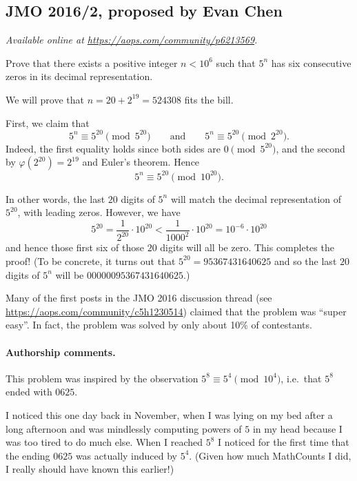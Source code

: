 \documentclass[11pt]{scrartcl}
\begin{document}
\subsection{JMO 2016/2, proposed by Evan Chen}
\textsl{Available online at \url{https://aops.com/community/p6213569}.}
\begin{mdframed}[style=mdpurplebox,frametitle={Problem statement}]
Prove that there exists a positive integer $n < 10^6$
such that $5^n$ has six consecutive zeros in its decimal representation.
\end{mdframed}
We will prove that $\boxed{n = 20 + 2^{19} = 524308}$ fits the bill.

First, we claim that
\[ 5^n \equiv 5^{20} \pmod{5^{20}} \qquad\text{and}\qquad
  5^n \equiv 5^{20} \pmod{2^{20}}. \]
Indeed, the first equality holds since both sides are $0 \pmod{5^{20}}$,
and the second by $\varphi(2^{20}) = 2^{19}$ and Euler's theorem.
Hence \[ 5^n \equiv 5^{20} \pmod{10^{20}}. \]

In other words, the last $20$ digits of $5^n$
will match the decimal representation of $5^{20}$, with leading zeros.
However, we have
\[ 5^{20} = \frac{1}{2^{20}} \cdot 10^{20}
  < \frac{1}{1000^2} \cdot 10^{20} = 10^{-6} \cdot 10^{20} \]
and hence those first six of those $20$ digits will all be zero.
This completes the proof!
(To be concrete, it turns out that $5^{20} = 95367431640625$
and so the last $20$ digits of $5^n$ will be $00000095367431640625$.)

\begin{remark*}
  Many of the first posts in the JMO 2016 discussion thread
  (see \url{https://aops.com/community/c5h1230514})
  claimed that the problem was ``super easy''.
  In fact, the problem was solved by only about 10\% of contestants.
\end{remark*}

\paragraph{Authorship comments.}
This problem was inspired by the observation $5^8 \equiv 5^4 \pmod{10^4}$,
i.e.\ that $5^8$ ended with $0625$.

I noticed this one day back in November, when I was lying on my bed after
a long afternoon and was mindlessly computing powers of $5$ in my head
because I was too tired to do much else.
When I reached $5^8$ I noticed for the first time that the ending
$0625$ was actually induced by $5^4$.
(Given how much MathCounts I did, I really should have known this earlier!)
\end{document}
